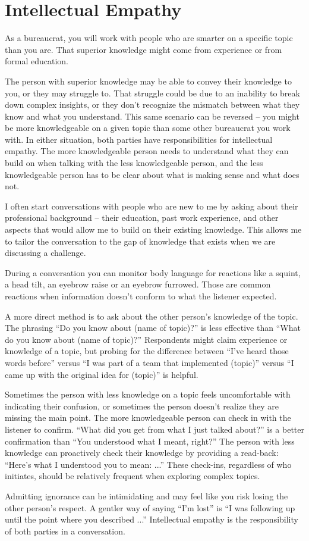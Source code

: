 \section{Intellectual Empathy\label{sec:intellectual-empathy}}

As a bureaucrat, you will work with people who are smarter on a specific topic than you are. That superior knowledge might come from experience or from formal education. 

The person with superior knowledge may be able to convey their knowledge to you, or they may struggle to. That struggle could be due to an inability to break down complex insights, or they don't recognize the mismatch between what they know and what you understand. 
This same scenario can be reversed -- you might be more knowledgeable on a given topic than some other bureaucrat you work with. In either situation, both parties have responsibilities for \gls{intellectual empathy}. The more knowledgeable person needs to understand what they can build on when talking with the less knowledgeable person, and the less knowledgeable person has to be clear about what is making sense and what does not. 

I often start conversations with people who are new to me by asking about their professional background -- their education, past work experience, and other aspects that would allow me to build on their existing knowledge. This allows me to tailor the conversation to the gap of knowledge that exists when we are discussing a challenge. 

During a conversation you can monitor body language for reactions like a squint, a head tilt, an eyebrow raise or an eyebrow furrowed. Those are common reactions when information doesn't conform to what the listener expected. 

A more direct method is to ask about the other person's knowledge of the topic. The phrasing ``Do you know about (name of topic)?'' is less effective than ``What do you know about (name of topic)?'' Respondents might claim experience or knowledge of a topic, but probing for the difference between ``I've heard those words before'' versus ``I was part of a team that implemented (topic)'' versus ``I came up with the original idea for (topic)'' is helpful. 

Sometimes the person with less knowledge on a topic feels uncomfortable with indicating their confusion, or sometimes the person doesn't realize they are missing the main point. The more knowledgeable person can check in with the listener to confirm. ``What did you get from what I just talked about?'' is a better confirmation than ``You understood what I meant, right?'' The person with less knowledge can proactively check their knowledge by providing a read-back: ``Here's what I understood you to mean: ...'' These check-ins, regardless of who initiates, should be relatively frequent when exploring complex topics. 

Admitting ignorance can be intimidating and may feel like you risk losing the other person's respect. A gentler way of saying ``I'm lost'' is ``I was following up until the point where you described ...'' Intellectual empathy is the responsibility of both parties in a conversation. 